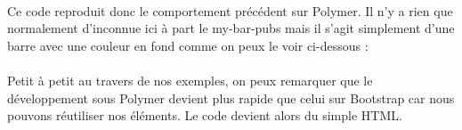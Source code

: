 \documentclass{article}
\begin{document}
\vspace{0.5cm}\\
Ce code reproduit donc le comportement pr\'ec\'edent sur Polymer. Il n'y a rien que normalement d'inconnue ici \`a part le \og my-bar-pubs \fg{} mais il s'agit simplement d'une barre avec une couleur en fond comme on peux le voir ci-dessous : 
\vspace{0.5cm}\\
\vspace{0.5cm}\\

Petit \`a petit au travers de nos exemples, on peux remarquer que le d\'eveloppement sous Polymer devient plus rapide que celui sur Bootstrap car nous pouvons r\'eutiliser nos \'el\'ements. Le code devient alors du simple HTML.
\end{document}
